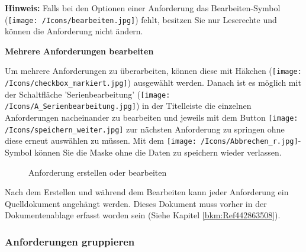\vspace{\baselineskip}

\textbf{Hinweis:} Falls bei den Optionen einer Anforderung das Bearbeiten-Symbol (\texttt{[image: /Icons/bearbeiten.jpg]}) fehlt, besitzen Sie nur Leserechte und können die Anforderung nicht ändern.

\vspace{\baselineskip}

\textbf{Mehrere Anforderungen bearbeiten}

Um mehrere Anforderungen zu überarbeiten, können diese mit Häkchen (\texttt{[image: /Icons/checkbox\_markiert.jpg]}) ausgewählt werden. Danach ist es möglich mit der Schaltfläche 'Serienbearbeitung' (\texttt{[image: /Icons/A\_Serienbearbeitung.jpg]}) in der Titelleiste die einzelnen Anforderungen nacheinander zu bearbeiten und jeweils mit dem Button \texttt{[image: /Icons/speichern\_weiter.jpg]}  zur nächsten Anforderung zu springen ohne diese erneut auswählen zu müssen. Mit dem \texttt{[image: /Icons/Abbrechen\_r.jpg]}-Symbol  können Sie die Maske ohne die Daten zu speichern wieder verlassen. \\

\begin{figure}[H]
\caption{Anforderung erstellen oder bearbeiten}
\end{figure}

Nach dem Erstellen und während dem Bearbeiten kann jeder Anforderung ein Quelldokument angehängt werden. Dieses Dokument muss vorher in der Dokumentenablage erfasst worden sein (Siehe Kapitel \ref{bkm:Ref442863508}). 

\subsubsection{Anforderungen gruppieren}

